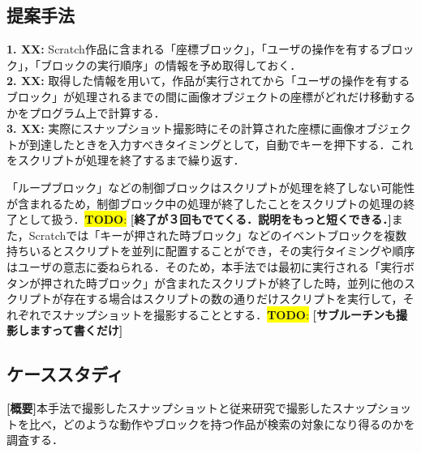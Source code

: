 \documentclass[uplatex,dvipdfmx,a4paper,twocolumn,base=11pt,jbase=11pt,ja=standard]{bxjsarticle}  %
\newcommand{\todo}[1]{\colorbox{yellow}{{\bf TODO}:}{\color{red} {\textbf{[#1]}}}}
\begin{document}


\subsection{提案手法}


\noindent\textbf{1. XX: }Scratch作品に含まれる「座標ブロック」，「ユーザの操作を有するブロック」，「ブロックの実行順序」の情報を予め取得しておく．\\
\noindent\textbf{2. XX: }取得した情報を用いて，作品が実行されてから「ユーザの操作を有するブロック」が処理されるまでの間に画像オブジェクトの座標がどれだけ移動するかをプログラム上で計算する．\\
\noindent\textbf{3. XX: }実際にスナップショット撮影時にその計算された座標に画像オブジェクトが到達したときを入力すべきタイミングとして，自動でキーを押下する．これをスクリプトが処理を終了するまで繰り返す．

「ループブロック」などの制御ブロックはスクリプトが処理を終了しない可能性が含まれるため，制御ブロック中の処理が終了したことをスクリプトの処理の終了として扱う．\todo{終了が３回もでてくる．説明をもっと短くできる．}また，Scratchでは「キーが押された時ブロック」などのイベントブロックを複数持ちいるとスクリプトを並列に配置することができ，その実行タイミングや順序はユーザの意志に委ねられる．そのため，本手法では最初に実行される「実行ボタンが押された時ブロック」が含まれたスクリプトが終了した時，並列に他のスクリプトが存在する場合はスクリプトの数の通りだけスクリプトを実行して，それぞれでスナップショットを撮影することとする．\todo{サブルーチンも撮影しますって書くだけ}


\subsection{ケーススタディ}

\noindent\textbf{[概要]}本手法で撮影したスナップショットと従来研究で撮影したスナップショットを比べ，どのような動作やブロックを持つ作品が検索の対象になり得るのかを調査する．
\end{document}
